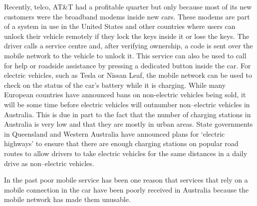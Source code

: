 Recently, telco, AT\&T had a profitable quarter but only because most of its new customers were the broadband modems inside new cars. These modems are part of a system in use in the United States and other countries where users can unlock their vehicle remotely if they lock the keys inside it or lose the keys. The driver calls a service centre and, after verifying ownership, a code is sent over the mobile network to the vehicle to unlock it. This service can also be used to call for help or roadside assistance by pressing a dedicated button inside the car. For electric vehicles, such as Tesla or Nissan Leaf, the mobile network can be used to check on the status of the car's battery while it is charging.  While many European countries have announced bans on non-electric vehicles being sold, it will be some time before electric vehicles will outnumber non--electric vehicles in Australia. This is due in part to the fact that the number of charging stations in Australia is very low and that they are mostly in urban areas. State governments in Queensland and Western Australia have announced plans for `electric highways' to ensure that there are enough charging stations on popular road routes to allow drivers to take electric vehicles for the same distances in a daily drive as non--electric vehicles.

In the past poor mobile service has been one reason that services that rely on a mobile connection in the car have been poorly received in Australia because the mobile network has made them unusable.


